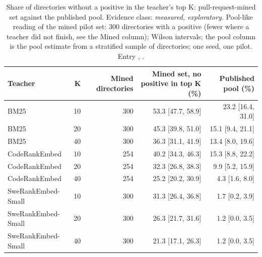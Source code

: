\begin{table}[t]
\centering\small
\caption{Share of directories without a positive in the teacher's top K: pull-request-mined set against the published pool. Evidence class: \emph{measured, exploratory}. Pool-like reading of the mined pilot set: 300 directories with a positive (fewer where a teacher did not finish, see the Mined column); Wilson intervals; the pool column is the pool estimate from a stratified sample of directories; one seed, one pilot. Entry , .}
\label{tab:mined_vs_pool_ranks}
\begin{tabular}{lrrrr}
\toprule
Teacher & K & Mined directories & Mined set, no positive in top K (\%) & Published pool (\%) \\
\midrule
BM25 & 10 & 300 & 53.3 [47.7, 58.9] & 23.2 [16.4, 31.0] \\
BM25 & 20 & 300 & 45.3 [39.8, 51.0] & 15.1 [9.4, 21.1] \\
BM25 & 40 & 300 & 36.3 [31.1, 41.9] & 13.4 [8.0, 19.6] \\
CodeRankEmbed & 10 & 254 & 40.2 [34.3, 46.3] & 15.3 [8.8, 22.2] \\
CodeRankEmbed & 20 & 254 & 32.3 [26.8, 38.3] & 9.9 [5.2, 15.9] \\
CodeRankEmbed & 40 & 254 & 25.2 [20.2, 30.9] & 4.3 [1.6, 8.0] \\
SweRankEmbed-Small & 10 & 300 & 31.3 [26.4, 36.8] & 1.7 [0.2, 3.9] \\
SweRankEmbed-Small & 20 & 300 & 26.3 [21.7, 31.6] & 1.2 [0.0, 3.5] \\
SweRankEmbed-Small & 40 & 300 & 21.3 [17.1, 26.3] & 1.2 [0.0, 3.5] \\
\bottomrule
\end{tabular}
\end{table}
